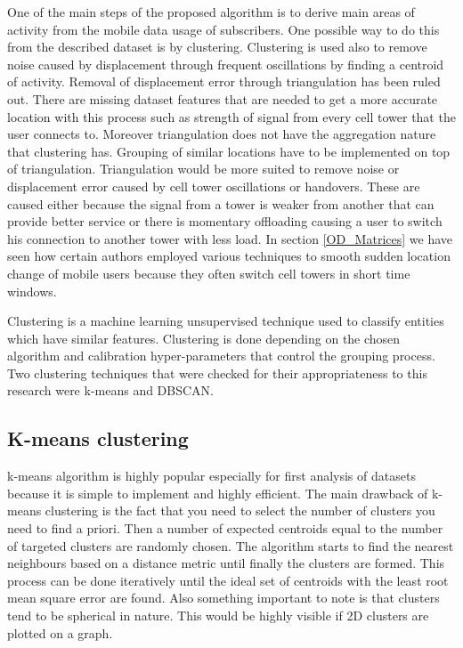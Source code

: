 \documentclass[12pt, a4paper]{report}
\theoremstyle{definition}
\theoremstyle{definition}%
\theoremstyle{definition}%
\theoremstyle{definition}%
\theoremstyle{definition}%
\theoremstyle{definition}%
\begin{document}
One of the main steps of the proposed algorithm is to derive main areas of activity from the mobile data usage of subscribers. One possible way to do this from the described dataset is by clustering. Clustering is used also to remove noise caused by displacement through frequent oscillations by finding a centroid of activity. Removal of displacement error through triangulation has been ruled out. There are missing dataset features that are needed to get a more accurate location with this process such as strength of signal from every cell tower that the user connects to. Moreover triangulation does not have the aggregation nature that clustering has. Grouping of similar locations have to be implemented on top of triangulation. Triangulation would be more suited to remove noise or displacement error caused by cell tower oscillations or handovers. These are caused either because the signal from a tower is weaker from another that can provide better service or there is momentary offloading causing a user to switch his connection to another tower with less load. In section \ref{OD_Matrices} we have seen how certain authors employed various techniques to smooth sudden location change of mobile users because they often switch cell towers in short time windows. 
 
Clustering is a machine learning unsupervised technique used to classify entities which have similar features. Clustering is done depending on the chosen algorithm and calibration hyper-parameters that control the grouping process. Two clustering techniques that were checked for their appropriateness to this research were k-means and DBSCAN. 

\subsection{K-means clustering} \label{subsection:methodology:kmeans_clustering}
k-means algorithm is highly popular especially for first analysis of datasets because it is simple to implement and highly efficient. The main drawback of k-means clustering is the fact that you need to select the number of clusters you need to find a priori. Then a number of expected centroids equal to the number of targeted clusters are randomly chosen. The algorithm starts to find the nearest neighbours based on a distance metric until finally the clusters are formed. This process can be done iteratively until the ideal set of centroids with the least root mean square error are found. Also something important to note is that clusters tend to be spherical in nature. This would be highly visible if 2D clusters are plotted on a graph.
\end{document}
